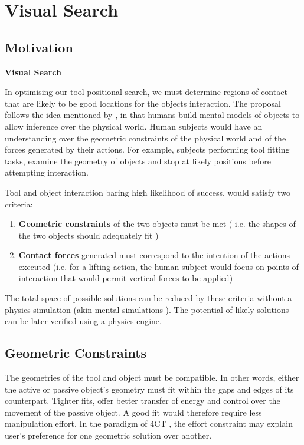 \documentclass[
    floatsintext
]{article}
\let \shorttitle \textbf
\begin{document}
\section{Visual Search}

\subsection{Motivation}
\shorttitle{Visual Search}

In optimising our tool positional search, we must determine regions of contact that are likely to be good locations for the objects interaction.
The proposal follows the idea mentioned by \cite{battaglia2013}, in that humans build mental models of objects to allow inference over the physical world.
Human subjects would have an understanding over the geometric constraints of the physical world and of the forces generated by their actions.
For example, subjects performing tool fitting tasks, examine the geometry of objects and stop at likely positions before attempting interaction.  

Tool and object interaction baring high likelihood of success, would satisfy two criteria: 
\begin{enumerate}
\item \textbf{Geometric constraints} of the two objects must be met ( i.e. the shapes of the two objects should adequately fit )
\item \textbf{Contact forces} generated must correspond to the intention of the actions executed 
  (i.e. for a lifting action, the human subject would focus on points of interaction that would permit vertical forces to be applied)
\end{enumerate}

The total space of possible solutions can be reduced by these criteria without a physics simulation (akin mental simulations \cite{osiurak2014}).
The potential of likely solutions can be later verified using a physics engine. 

\subsection{Geometric Constraints}
The geometries of the tool and object must be compatible. In other words, either the active or passive object's geometry must fit within the gaps and edges of its counterpart.
Tighter fits, offer better transfer of energy and control over the movement of the passive object. A good fit would therefore require less manipulation effort.
In the paradigm of 4CT \cite{osiurak2014}, the effort constraint may explain user's preference for one geometric solution over another.
\end{document}
